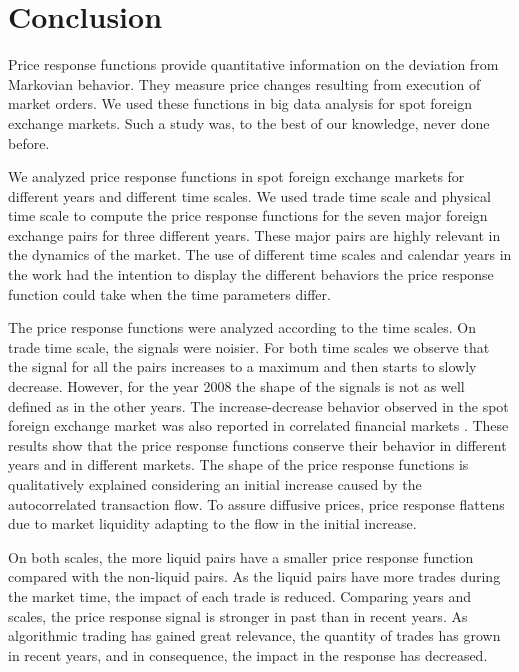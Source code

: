 \section{Conclusion}\label{sec:conclusion}

Price response functions provide quantitative information on the deviation from
Markovian behavior. They measure price changes resulting from execution of
market orders. We used these functions in big data analysis for spot foreign
exchange markets. Such a study was, to the best of our knowledge, never done
before.

We analyzed price response functions in spot foreign exchange markets for
different years and different time scales. We used trade time scale and
physical time scale to compute the price response functions for the seven major
foreign exchange pairs for three different years. These major pairs are highly
relevant in the dynamics of the market. The use of different time scales and
calendar years in the work had the intention to display the different behaviors
the price response function could take when the time parameters differ.

The price response functions were analyzed according to the time scales. On
trade time scale, the signals were noisier. For both time scales we observe
that the signal for all the pairs increases to a maximum and then starts to
slowly decrease. However, for the year 2008 the shape of the signals is not as
well defined as in the other years. The increase-decrease behavior observed in
the spot foreign exchange market was also reported in correlated financial
markets \cite{my_paper_response_financial,Wang_2016_avg}. These results show
that the price response functions conserve their behavior in different years
and in different markets. The shape of the price
response functions is qualitatively explained considering an initial increase
caused by the autocorrelated transaction flow. To assure diffusive prices,
price response flattens due to market liquidity adapting to the flow in the
initial increase.

On both scales, the more liquid pairs have a smaller price response function
compared with the non-liquid pairs. As the liquid pairs have more trades during
the market time, the impact of each trade is reduced. Comparing years and
scales, the price response signal is stronger in past than in recent years. As
algorithmic trading has gained great relevance, the quantity of trades has
grown in recent years, and in consequence, the impact in the response has
decreased.

